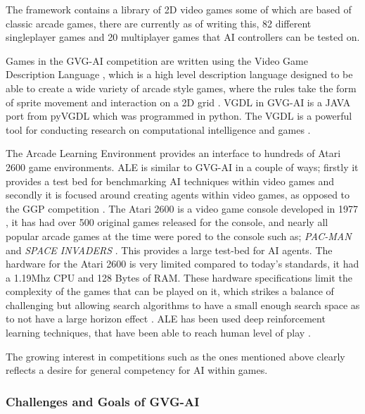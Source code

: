 \documentclass[journal]{IEEEtran}
\begin{document}
		The framework contains a library of 2D video games some of which are based of classic arcade games, there are currently as of writing this, 82 different singleplayer games and 20 multiplayer games that AI controllers can be tested on.
		
		Games in the GVG-AI competition are written using the Video Game Description Language \cite{schaul2014extensible}, which is a high level description language designed to be able to create a wide variety of arcade style games, where the rules take the form of sprite movement and interaction on a 2D grid \cite{nelson2016investigating}.
		VGDL in GVG-AI is a JAVA port from pyVGDL which was programmed in python. The VGDL is a powerful tool for conducting research on computational intelligence and games \cite{schaul2014extensible, love2008general}.

		The Arcade Learning Environment \cite{bellemare2013arcade} provides an interface to hundreds of Atari 2600 game environments. ALE is similar to GVG-AI in a couple of ways; firstly it provides a test bed for benchmarking AI techniques within video games and secondly it is focused around creating agents within video games, as opposed to the GGP competition \cite{GGP2005general}.
		The Atari 2600 is a video game console developed in 1977 , it has had over 500 original games released for the console, and nearly all popular arcade games at the time were pored to the console such as; \textit{PAC-MAN} and \textit{SPACE INVADERS} \cite{bellemare2013arcade}. This provides a large test-bed for AI agents.
		The hardware for the Atari 2600 is very limited compared to today's standards, it had a 1.19Mhz CPU and 128 Bytes of RAM. These hardware specifications limit the complexity of the games that can be played on it, which strikes a balance of challenging but allowing search algorithms to have a small enough search space as to not have a large horizon effect \cite{bellemare2013arcade}.
		ALE has been used deep reinforcement learning techniques, that have been able to reach human level of play \cite{mnih2015human, gaina2017rolling}.
		

		
		
		
		The growing interest in competitions such as the ones mentioned above clearly reflects a desire for general competency for AI within games.

	\subsubsection{Challenges and Goals of GVG-AI}
\end{document}
